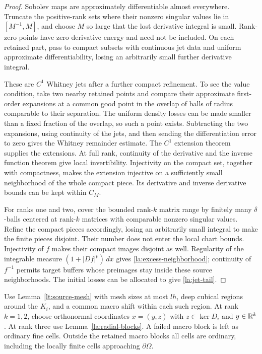 \begin{proof}
Sobolev maps are approximately differentiable almost everywhere.
Truncate the positive-rank sets where their nonzero singular values
lie in $[M^{-1},M]$, and choose $M$ so large that the lost derivative
integral is small.  Rank-zero points have zero derivative energy and
need not be included.  On each retained part, pass to compact subsets
with continuous jet data and uniform approximate differentiability,
losing an arbitrarily small further derivative integral.

These are $C^1$ Whitney jets after a further compact refinement.  To
see the value condition, take two nearby retained points and compare
their approximate first-order expansions at a common good point in
the overlap of balls of radius comparable to their separation.  The
uniform density losses can be made smaller than a fixed fraction of
the overlap, so such a point exists.  Subtracting the two expansions,
using continuity of the jets, and then sending the differentiation
error to zero gives the Whitney remainder estimate.  The $C^1$
extension theorem~\cite[Part~I, Section~4, Theorem~I]{Whitney1934} supplies the extensions.  At full rank, continuity
of the derivative and the inverse function theorem give local
invertibility.  Injectivity on the compact set, together with
compactness, makes the extension injective on a sufficiently small
neighborhood of the whole compact piece.  Its derivative and inverse
derivative bounds can be kept within $C_M$.

For ranks one and two, cover the bounded rank-$k$ matrix range by
finitely many $\delta$-balls centered at rank-$k$ matrices with
comparable nonzero singular values.  Refine the compact pieces
accordingly, losing an arbitrarily small integral to make the finite
pieces disjoint.  Their number does not enter the local chart
bounds.  Injectivity of $f$ makes their compact images disjoint as
well.  Regularity of the integrable measure $(1+|Df|^p)\,dx$ gives
\eqref{la:excess-neighborhood}; continuity of $f^{-1}$ permits target
buffers whose preimages stay inside these source neighborhoods.
The initial losses can be allocated to give
\eqref{la:jet-tail}.
\end{proof}

Use Lemma~\ref{lt:source-mesh} with mesh sizes at most $lh$, deep
cubical regions around the $K_i$, and a common macro shift within
each such region.  At rank $k=1,2$, choose orthonormal coordinates
$x=(y,z)$ with $z\in\ker D_i$ and $y\in\mathbb R^k$.  At rank three use
Lemma~\ref{la:radial-blocks}.  A failed macro block is left as ordinary
fine cells.  Outside the retained macro blocks all cells are ordinary,
including the locally finite cells approaching $\partial\Omega$.

